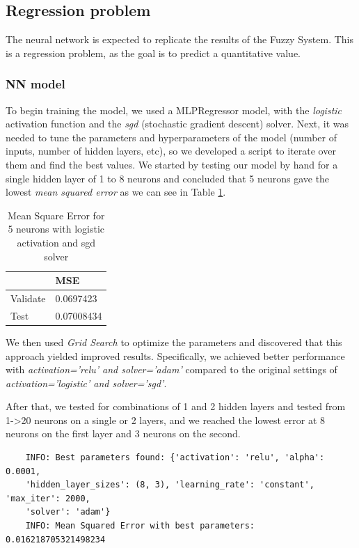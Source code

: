 \subsection{Regression problem}

The neural network is expected to replicate the results of the Fuzzy System. This is a regression problem, as the goal is to predict a quantitative value.


\subsubsection{NN model}

To begin training the model, we used a MLPRegressor model, with the \textit{logistic} activation function and the \textit{sgd} (stochastic gradient descent) solver.
Next, it was needed to tune the parameters and hyperparameters of the model (number of inputs, number of hidden layers, etc), so we developed a script to iterate over them and find the best values.
We started by testing our model by hand for a single hidden layer of 1 to 8 neurons and concluded that 5 neurons gave the lowest \textit{mean squared error} as we can see in Table \ref{tab:MSE_5_log_sgd}.

\begin{table}[H]
    \centering
    \begin{tabular}{l|l|}
        \cline{2-2}
                                       & MSE       \\ \hline
        \multicolumn{1}{|l|}{Validate} & 0.0697423 \\ \hline
        \multicolumn{1}{|l|}{Test}     & 0.07008434  \\ \hline
    \end{tabular}
    \caption{Mean Square Error for 5 neurons with logistic activation and sgd solver}
    \label{tab:MSE_5_log_sgd}
\end{table}

We then used \textit{Grid Search} to optimize the parameters and discovered that this approach yielded improved results. Specifically, we achieved better performance with \textit{activation='relu' and solver='adam'} compared to the original settings of \textit{activation='logistic' and solver='sgd'}.

After that, we tested for combinations of 1 and 2 hidden layers and tested from 1->20 neurons on a single or 2 layers, and we reached the lowest error at 8 neurons on the first layer and 3 neurons on the second.

\begin{verbatim}
    INFO: Best parameters found: {'activation': 'relu', 'alpha': 0.0001,
    'hidden_layer_sizes': (8, 3), 'learning_rate': 'constant', 'max_iter': 2000,
    'solver': 'adam'}
    INFO: Mean Squared Error with best parameters: 0.016218705321498234
\end{verbatim}

